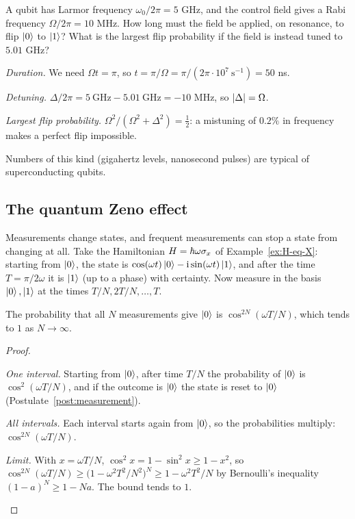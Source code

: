 \begin{example}\label{ex:pi-pulse}
  A qubit has Larmor frequency $\omega_0/2\pi=5$ GHz, and the control field gives a Rabi frequency $\Omega/2\pi=10$ MHz. How long must the field be applied, on resonance, to flip $\left|0\right\rangle$ to $\left|1\right\rangle$? What is the largest flip probability if the field is instead tuned to $5.01$ GHz?
\end{example}
\begin{solution}
  \begin{steps}
    \item \emph{Duration.} We need $\Omega t=\pi$, so $t=\pi/\Omega=\pi/(2\pi\cdot10^7\ \mathrm{s}^{-1})=50$ ns.
    \item \emph{Detuning.} $\Delta/2\pi=5\ \mathrm{GHz}-5.01\ \mathrm{GHz}=-10$ MHz, so $\left|\Delta\right|=\Omega$.
    \item \emph{Largest flip probability.} $\Omega^2/(\Omega^2+\Delta^2)=\tfrac12$: a mistuning of $0.2\%$ in frequency makes a perfect flip impossible.
  \end{steps}
  Numbers of this kind (gigahertz levels, nanosecond pulses) are typical of superconducting qubits.
\end{solution}

\subsection{The quantum Zeno effect}

Measurements change states, and frequent measurements can stop a state from changing at all. Take the Hamiltonian $H=\hbar\omega\sigma_x$ of Example~\ref{ex:H-eq-X}: starting from $\left|0\right\rangle$, the state is $\cos(\omega t)\left|0\right\rangle-\mathrm{i}\sin(\omega t)\left|1\right\rangle$, and after the time $T=\pi/2\omega$ it is $\left|1\right\rangle$ (up to a phase) with certainty. Now measure in the basis $\left|0\right\rangle,\left|1\right\rangle$ at the times $T/N,2T/N,\dots,T$.

\begin{proposition}\label{prop:zeno}
  The probability that all $N$ measurements give $\left|0\right\rangle$ is $\cos^{2N}(\omega T/N)$, which tends to $1$ as $N\to\infty$.
\end{proposition}
\begin{proof}
  \begin{steps}
    \item \emph{One interval.} Starting from $\left|0\right\rangle$, after time $T/N$ the probability of $\left|0\right\rangle$ is $\cos^2(\omega T/N)$, and if the outcome is $\left|0\right\rangle$ the state is reset to $\left|0\right\rangle$ (Postulate~\ref{post:measurement}).
    \item \emph{All intervals.} Each interval starts again from $\left|0\right\rangle$, so the probabilities multiply: $\cos^{2N}(\omega T/N)$.
    \item \emph{Limit.} With $x=\omega T/N$, $\cos^2x=1-\sin^2x\ge1-x^2$, so $\cos^{2N}(\omega T/N)\ge\bigl(1-\omega^2T^2/N^2\bigr)^N\ge1-\omega^2T^2/N$ by Bernoulli's inequality $(1-a)^N\ge1-Na$. The bound tends to $1$. \qedhere
  \end{steps}
\end{proof}

